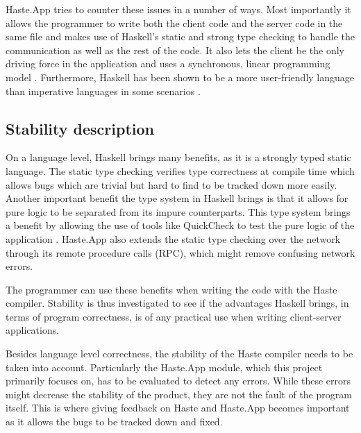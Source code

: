 \documentclass[a4paper]{article}
\begin{document}
Haste.App tries to counter these issues in a number of ways. Most importantly it allows the programmer to write both the client code and the server code in the same file and makes use of Haskell's static and strong type checking to handle the communication as well as the rest of the code. It also lets the client be the only driving force in the application and uses a synchronous, linear programming model \cite{ekblad2015seamless}. Furthermore, Haskell has been shown to be a more user-friendly language than imperative languages in some scenarios \cite{mathematical-comparison-haskell-c++}. 



\subsection{Stability description}
On a language level, Haskell brings many benefits, as it is a strongly typed static language. The static type checking verifies type correctness at compile time which allows bugs which are trivial but hard to find to be tracked down more easily. Another important benefit the type system in Haskell brings is that it allows for pure logic to be separated from its impure counterparts. This type system brings a benefit by allowing the use of tools like QuickCheck to test the pure logic of the application \cite{Claessen:2011:QLT:1988042.1988046}. Haste.App also extends the static type checking over the network through its remote procedure calls (RPC), which might remove confusing network errors. 

The programmer can use these benefits when writing the code with the Haste compiler. Stability is thus investigated to see if the advantages Haskell brings, in terms of program correctness, is of any practical use when writing client-server applications.

Besides language level correctness, the stability of the Haste compiler needs to be taken into account. Particularly the Haste.App module, which this project primarily focuses on, has to be evaluated to detect any errors. While these errors might decrease the stability of the product, they are not the fault of the program itself. This is where giving feedback on Haste and Haste.App becomes important as it allows the bugs to be tracked down and fixed.
\end{document}
